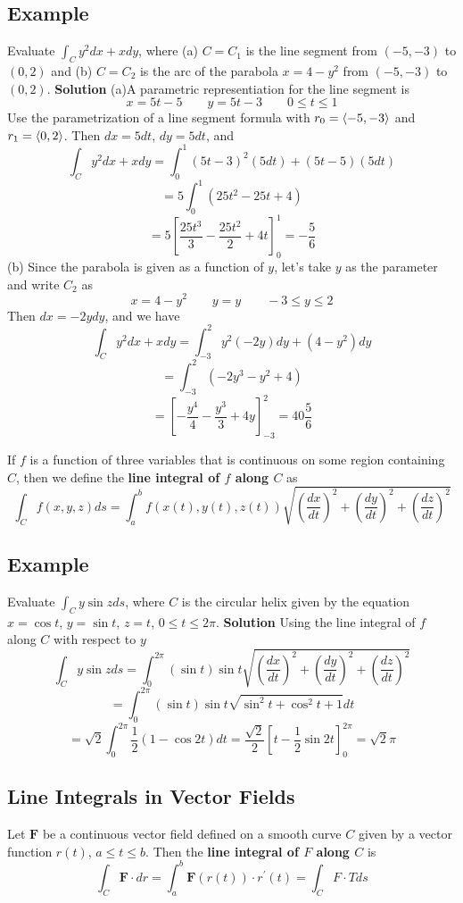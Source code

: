 \subsection*{Example}
Evaluate $\int_Cy^2 dx + x dy$, where (a) $C = C_1$ is the line segment from $(-5,-3)$ to $(0,2)$ and (b) $C = C_2$ is the arc of the parabola $x = 4 - y^2$ from $(-5,-3)$ to $(0,2)$.
\textbf{Solution} (a)A parametric representiation for the line segment is $$x = 5t-5\qquad y= 5t-3\qquad 0\leq t\leq 1$$
Use the parametrization of a line segment formula with $r_0 = \ev{-5, -3}$ and $r_1 = \ev{0,2}$. Then $dx = 5 dt$, $dy = 5 dt$, and 
$$\int_Cy^2 dx + x dy = \int^1_0(5t-3)^2(5 dt) + (5t-5)(5 dt)$$ $$= 5\int^1_0(25t^2-25t+4)$$ 
$$= 5\left[\frac{25t^3}{3} - \frac{25t^2}{2} + 4t\right]^1_0 = -\frac{5}{6}$$
(b) Since the parabola is given as a function of $y$, let's take $y$ as the parameter and write $C_2$ as 
$$x = 4-y^2\qquad y = y\qquad -3\leq y\leq 2$$ Then $dx = -2y dy$, and we have
$$\int_Cy^2 dx + x dy = \int^2_{-3}y^2(-2y)dy + (4-y^2)dy$$ $$= \int^2_{-3}(-2y^3 - y^2 + 4)$$
$$= \left[-\frac{y^4}{4} - \frac{y^3}{3} + 4y\right]^2_{-3} = 40\frac{5}{6}$$

If $f$ is a function of three variables that is continuous on some region containing $C$, then we define the \textbf{line integral of $f$ along $C$} as
$$\int_Cf(x,y,z)ds = \int^b_a f(x(t), y(t), z(t))\sqrt{(\frac{dx}{dt})^2 + (\frac{dy}{dt})^2 + (\frac{dz}{dt})^2}$$

\subsection*{Example}
Evaluate $\int_Cy\sin{z} ds$, where $C$ is the circular helix given by the equation $x = \cos{t}$, $y = \sin{t}$, $z = t$, $0\leq t\leq 2\pi$. 
\textbf{Solution} Using the line integral of $f$ along $C$ with respect to $y$
$$\int_Cy\sin{z} ds = \int^{2\pi}_0(\sin{t})\sin{t}\sqrt{(\frac{dx}{dt})^2 + (\frac{dy}{dt})^2 + (\frac{dz}{dt})^2}$$
$$= \int^{2\pi}_0(\sin{t})\sin{t}\sqrt{\sin^2{t} + \cos^2{t} + 1} dt$$
$$= \sqrt{2}\int^{2\pi}_0\frac{1}{2}(1 - \cos{2t})dt = \frac{\sqrt{2}}{2}\left[t-\frac{1}{2}\sin{2t}\right]^{2\pi}_0 = \sqrt{2}\pi$$

\subsection*{Line Integrals in Vector Fields}
Let $\textbf{F}$ be a continuous vector field defined on a smooth curve $C$ given by a vector function $r(t)$, $a\leq t\leq b$. Then the \textbf{line integral of $F$ along $C$} is 
$$\int_C\textbf{F}\cdot dr = \int^b_a\textbf{F}(r(t))\cdot r^\prime(t) = \int_CF\cdot T ds$$
